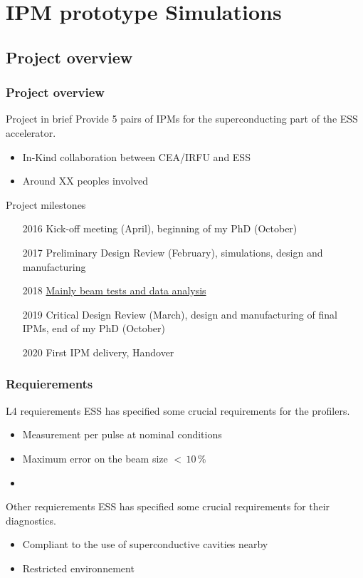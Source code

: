 \section{IPM prototype Simulations}
\subsection{Project overview}
\begin{frame}
  \frametitle{Project overview}
  \begin{block}{Project in brief}
    Provide 5 pairs of IPMs for the superconducting part of the ESS accelerator.
    \begin{itemize}
      \item In-Kind collaboration between CEA/IRFU and ESS
      \item Around XX peoples involved
    \end{itemize}
  \end{block}
  \begin{block}{Project milestones}
    \begin{itemize}
      \item[2016] Kick-off meeting (April), beginning of my PhD (October)
      \item[2017] Preliminary Design Review (February), simulations, design and manufacturing
      \item[2018] \underline{Mainly beam tests and data analysis}
      \item[2019] Critical Design Review (March), design and manufacturing of final IPMs, end of my PhD (October)
      \item[2020] First IPM delivery, Handover 
    \end{itemize}
  \end{block}
\end{frame}

\begin{frame}
  \frametitle{Requierements}
  \begin{block}{L4 requierements}
    ESS has specified some crucial requirements for the profilers.
    \begin{itemize}
      \item Measurement per pulse at nominal conditions
      \item Maximum error on the beam size $<\,10\,\%$
      \item 
    \end{itemize}
  \end{block}
  \begin{block}{Other requierements}
    ESS has specified some crucial requirements for their diagnostics.
    \begin{itemize}
      \item Compliant to the use of superconductive cavities nearby
      \item Restricted environnement
    \end{itemize}
  \end{block}
\end{frame}

